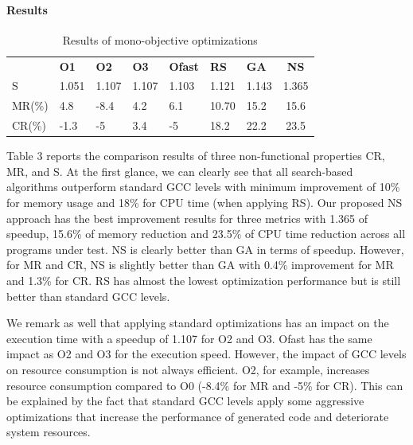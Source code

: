 




\paragraph{Results}


\vspace{-1.2em}
\begin{table}[h]
	\centering
	\caption{Results of mono-objective optimizations}
	\label{my-label}
	\begin{tabular}{|l|l|l|l|l|l|l|c|}
		\hline
		& \textbf{O1}                    & \textbf{O2}                    & \textbf{O3}                    & \textbf{Ofast}                 & \textbf{RS}                    & \textbf{GA}                    & 
		\textbf{NS} \\
		\hhline{|=|=|=|=|=|=|=|=|}
		S  &  1.051 & 1.107  & 1.107  & 1.103  & 1.121  &  1.143 &  1.365  \\ \hline
		MR(\%) & 4.8  & -8.4  &  4.2 & 6.1  &  10.70 & 15.2  &  15.6  \\ \hline
		CR(\%) & -1.3  & -5  & 3.4  & -5  &  18.2 & 22.2  &  23.5  \\ \hline
	\end{tabular}
\end{table}
Table 3 reports the comparison results of three non-functional properties CR, MR, and S. At the first glance, we can clearly see that all search-based algorithms outperform standard GCC levels with minimum improvement of 10\% for memory usage and 18\% for CPU time (when applying RS). 
Our proposed NS approach has the best improvement results for three metrics with 1.365 of speedup, 15.6\% of memory reduction and 23.5\% of CPU time reduction across all programs under test. NS is clearly better than GA in terms of speedup. However, for MR and CR, NS is slightly better than GA with 0.4\% improvement for MR and 1.3\% for CR. RS has almost the lowest optimization performance but is still better than standard GCC levels.

We remark as well that applying standard optimizations has an impact on the execution time with a speedup of 1.107 for O2 and O3. Ofast has the same impact as O2 and O3 for the execution speed. However, the impact of GCC levels on resource consumption is not always efficient. O2, for example, increases resource consumption compared to O0 (-8.4\% for MR and -5\% for CR). This can be explained by the fact that standard GCC levels apply some aggressive optimizations that increase the performance of generated code and deteriorate system resources.  

